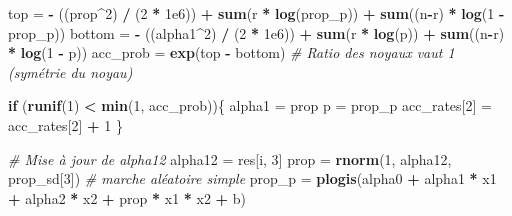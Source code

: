 \documentclass[
]{article}
\newenvironment{Shaded}{\begin{snugshade}}{\end{snugshade}}
\newcommand{\CommentTok}[1]{\textcolor[rgb]{0.56,0.35,0.01}{\textit{#1}}}
\newcommand{\ControlFlowTok}[1]{\textcolor[rgb]{0.13,0.29,0.53}{\textbf{#1}}}
\newcommand{\DecValTok}[1]{\textcolor[rgb]{0.00,0.00,0.81}{#1}}
\newcommand{\FloatTok}[1]{\textcolor[rgb]{0.00,0.00,0.81}{#1}}
\newcommand{\FunctionTok}[1]{\textcolor[rgb]{0.13,0.29,0.53}{\textbf{#1}}}
\newcommand{\NormalTok}[1]{#1}
\newcommand{\OtherTok}[1]{\textcolor[rgb]{0.56,0.35,0.01}{#1}}
\newcommand{\SpecialCharTok}[1]{\textcolor[rgb]{0.81,0.36,0.00}{\textbf{#1}}}
\begin{document}
\begin{Shaded}
\begin{Highlighting}[]
\NormalTok{    top }\OtherTok{=} \SpecialCharTok{{-}}\NormalTok{ ((prop}\SpecialCharTok{\^{}}\DecValTok{2}\NormalTok{) }\SpecialCharTok{/}\NormalTok{ (}\DecValTok{2} \SpecialCharTok{*} \FloatTok{1e6}\NormalTok{)) }\SpecialCharTok{+} \FunctionTok{sum}\NormalTok{(r }\SpecialCharTok{*} \FunctionTok{log}\NormalTok{(prop\_p)) }\SpecialCharTok{+} \FunctionTok{sum}\NormalTok{((n}\SpecialCharTok{{-}}\NormalTok{r) }\SpecialCharTok{*} \FunctionTok{log}\NormalTok{(}\DecValTok{1} \SpecialCharTok{{-}}\NormalTok{ prop\_p))}
\NormalTok{    bottom }\OtherTok{=} \SpecialCharTok{{-}}\NormalTok{ ((alpha1}\SpecialCharTok{\^{}}\DecValTok{2}\NormalTok{) }\SpecialCharTok{/}\NormalTok{ (}\DecValTok{2} \SpecialCharTok{*} \FloatTok{1e6}\NormalTok{)) }\SpecialCharTok{+} \FunctionTok{sum}\NormalTok{(r }\SpecialCharTok{*} \FunctionTok{log}\NormalTok{(p)) }\SpecialCharTok{+} \FunctionTok{sum}\NormalTok{((n}\SpecialCharTok{{-}}\NormalTok{r) }\SpecialCharTok{*} \FunctionTok{log}\NormalTok{(}\DecValTok{1} \SpecialCharTok{{-}}\NormalTok{ p))}
\NormalTok{    acc\_prob }\OtherTok{=} \FunctionTok{exp}\NormalTok{(top }\SpecialCharTok{{-}}\NormalTok{ bottom) }\CommentTok{\# Ratio des noyaux vaut 1 (symétrie du noyau)}
    
    \ControlFlowTok{if}\NormalTok{ (}\FunctionTok{runif}\NormalTok{(}\DecValTok{1}\NormalTok{) }\SpecialCharTok{\textless{}} \FunctionTok{min}\NormalTok{(}\DecValTok{1}\NormalTok{, acc\_prob))\{}
\NormalTok{      alpha1 }\OtherTok{=}\NormalTok{ prop}
\NormalTok{      p }\OtherTok{=}\NormalTok{ prop\_p}
\NormalTok{      acc\_rates[}\DecValTok{2}\NormalTok{] }\OtherTok{=}\NormalTok{ acc\_rates[}\DecValTok{2}\NormalTok{] }\SpecialCharTok{+} \DecValTok{1}
\NormalTok{    \}}

    \CommentTok{\# Mise à jour de alpha12}
\NormalTok{    alpha12 }\OtherTok{=}\NormalTok{ res[i, }\DecValTok{3}\NormalTok{]}
\NormalTok{    prop }\OtherTok{=} \FunctionTok{rnorm}\NormalTok{(}\DecValTok{1}\NormalTok{, alpha12, prop\_sd[}\DecValTok{3}\NormalTok{]) }\CommentTok{\# marche aléatoire simple}
\NormalTok{    prop\_p }\OtherTok{=} \FunctionTok{plogis}\NormalTok{(alpha0 }\SpecialCharTok{+}\NormalTok{ alpha1 }\SpecialCharTok{*}\NormalTok{ x1 }\SpecialCharTok{+}\NormalTok{ alpha2 }\SpecialCharTok{*}\NormalTok{ x2 }\SpecialCharTok{+}\NormalTok{ prop }\SpecialCharTok{*}\NormalTok{ x1 }\SpecialCharTok{*}\NormalTok{ x2 }\SpecialCharTok{+}\NormalTok{ b)}
    

\end{Highlighting}
\end{Shaded}
\end{document}
